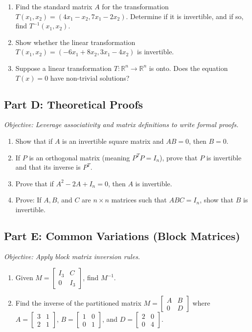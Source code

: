 \documentclass[12pt]{article}
\begin{document}
\begin{enumerate}[label=\textbf{\arabic*.}, resume]
    \item Find the standard matrix $A$ for the transformation $T(x_1, x_2) = (4x_1 - x_2, 7x_1 - 2x_2)$. Determine if it is invertible, and if so, find $T^{-1}(x_1, x_2)$.
    \item Show whether the linear transformation $T(x_1, x_2) = (-6x_1 + 8x_2, 3x_1 - 4x_2)$ is invertible.
    \item Suppose a linear transformation $T: \mathbb{R}^n \to \mathbb{R}^n$ is onto. Does the equation $T(x) = 0$ have non-trivial solutions?
\end{enumerate}

\subsection*{Part D: Theoretical Proofs}
\textit{Objective: Leverage associativity and matrix definitions to write formal proofs.}

\begin{enumerate}[label=\textbf{\arabic*.}, resume]
    \item Show that if $A$ is an invertible square matrix and $AB = 0$, then $B = 0$.
    \item If $P$ is an orthogonal matrix (meaning $P^T P = I_n$), prove that $P$ is invertible and that its inverse is $P^T$.
    \item Prove that if $A^2 - 2A + I_n = 0$, then $A$ is invertible.
    \item Prove: If $A, B$, and $C$ are $n \times n$ matrices such that $ABC = I_n$, show that $B$ is invertible.
\end{enumerate}

\subsection*{Part E: Common Variations (Block Matrices)}
\textit{Objective: Apply block matrix inversion rules.}

\begin{enumerate}[label=\textbf{\arabic*.}, resume]
    \item Given $M = \begin{bmatrix} I_3 & C \\ 0 & I_3 \end{bmatrix}$, find $M^{-1}$.
    \item Find the inverse of the partitioned matrix $M = \begin{bmatrix} A & B \\ 0 & D \end{bmatrix}$ where $A = \begin{bmatrix} 3 & 1 \\ 2 & 1 \end{bmatrix}$, $B = \begin{bmatrix} 1 & 0 \\ 0 & 1 \end{bmatrix}$, and $D = \begin{bmatrix} 2 & 0 \\ 0 & 4 \end{bmatrix}$.
\end{enumerate}
\end{document}
